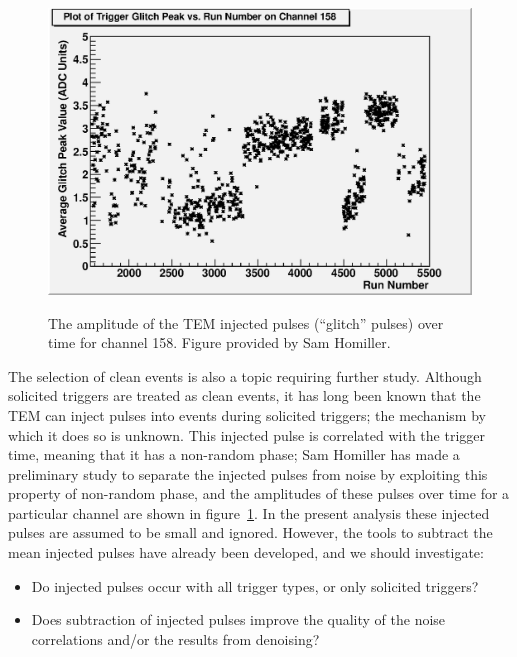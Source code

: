 \begin{figure}
\begin{center}
\includegraphics[keepaspectratio=true,width=\textwidth]{glitch_peak_vs_time_158.eps}
\end{center}
\renewcommand{\baselinestretch}{1}
\small\normalsize
\begin{quote}
\caption{The amplitude of the TEM injected pulses (``glitch'' pulses) over time for channel 158.  Figure provided by Sam Homiller.}
\label{fig:GlitchPeakAmplitudeVsTime}
\end{quote}
\end{figure}
\renewcommand{\baselinestretch}{2}
\small\normalsize

The selection of clean events is also a topic requiring further study.  Although solicited triggers are treated as clean events, it has long been known that the TEM can inject pulses into events during solicited triggers; the mechanism by which it does so is unknown.  This injected pulse is correlated with the trigger time, meaning that it has a non-random phase; Sam Homiller has made a preliminary study to separate the injected pulses from noise by exploiting this property of non-random phase, and the amplitudes of these pulses over time for a particular channel are shown in figure~\ref{fig:GlitchPeakAmplitudeVsTime}.  In the present analysis these injected pulses are assumed to be small and ignored.  However, the tools to subtract the mean injected pulses have already been developed, and we should investigate:
\begin{itemize}
\item Do injected pulses occur with all trigger types, or only solicited triggers?
\item Does subtraction of injected pulses improve the quality of the noise correlations and/or the results from denoising?
\end{itemize}

